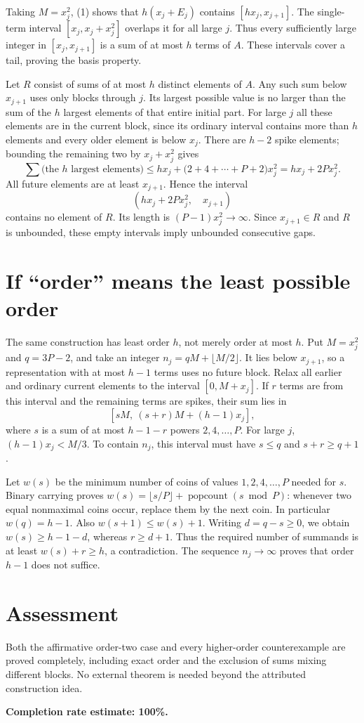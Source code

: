 \documentclass[11pt]{article}
\begin{document}
Taking $M=x_j^2$, (1) shows that $h(x_j+E_j)$ contains $[hx_j,x_{j+1}]$. The single-term interval $[x_j,x_j+x_j^2]$ overlaps it for all large $j$. Thus every sufficiently large integer in $[x_j,x_{j+1}]$ is a sum of at most $h$ terms of $A$. These intervals cover a tail, proving the basis property.

Let $R$ consist of sums of at most $h$ distinct elements of $A$. Any such sum below $x_{j+1}$ uses only blocks through $j$. Its largest possible value is no larger than the sum of the $h$ largest elements of that entire initial part. For large $j$ all these elements are in the current block, since its ordinary interval contains more than $h$ elements and every older element is below $x_j$. There are $h-2$ spike elements; bounding the remaining two by $x_j+x_j^2$ gives
\[
 \sum\text{(the $h$ largest elements)}
 \le hx_j+\bigl(2+4+\cdots+P+2\bigr)x_j^2
 =hx_j+2P x_j^2.
\]
All future elements are at least $x_{j+1}$. Hence the interval
\[
 (hx_j+2P x_j^2,\quad x_{j+1})
\]
contains no element of $R$. Its length is $(P-1)x_j^2\to\infty$. Since $x_{j+1}\in R$ and $R$ is unbounded, these empty intervals imply unbounded consecutive gaps.

\section*{If ``order'' means the least possible order}
The same construction has least order $h$, not merely order at most $h$. Put $M=x_j^2$ and $q=3P-2$, and take an integer $n_j=qM+\lfloor M/2\rfloor$. It lies below $x_{j+1}$, so a representation with at most $h-1$ terms uses no future block. Relax all earlier and ordinary current elements to the interval $[0,M+x_j]$. If $r$ terms are from this interval and the remaining terms are spikes, their sum lies in
\[
 [sM,\ (s+r)M+(h-1)x_j],
\]
where $s$ is a sum of at most $h-1-r$ powers $2,4,\ldots,P$. For large $j$, $(h-1)x_j<M/3$. To contain $n_j$, this interval must have $s\le q$ and $s+r\ge q+1$.

Let $w(s)$ be the minimum number of coins of values $1,2,4,\ldots,P$ needed for $s$. Binary carrying proves $w(s)=\lfloor s/P\rfloor+\operatorname{popcount}(s\bmod P)$: whenever two equal nonmaximal coins occur, replace them by the next coin. In particular $w(q)=h-1$. Also $w(s+1)\le w(s)+1$. Writing $d=q-s\ge0$, we obtain $w(s)\ge h-1-d$, whereas $r\ge d+1$. Thus the required number of summands is at least $w(s)+r\ge h$, a contradiction. The sequence $n_j\to\infty$ proves that order $h-1$ does not suffice.

\section*{Assessment}
Both the affirmative order-two case and every higher-order counterexample are proved completely, including exact order and the exclusion of sums mixing different blocks. No external theorem is needed beyond the attributed construction idea.

\textbf{Completion rate estimate: 100\%.}
\end{document}
